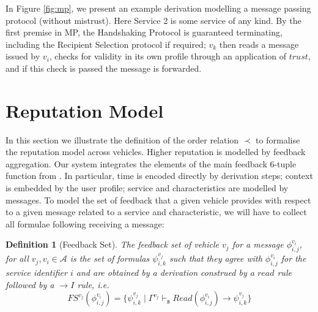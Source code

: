 \documentclass[compsoc, conference, letterpaper, 10pt, times]{IEEEtran}
\newtheorem{definition}{Definition}
\begin{document}

In Figure \ref{fig:mp}, we present an example derivation modelling a message passing protocol (without mistrust). Here Service 2 is some service of any kind. By the first premise in MP, the Handshaking Protocol is guaranteed terminating, including the Recipient Selection protocol if required; $v_{k}$ then reads a message issued by $v_{i}$, checks for validity in its own profile through an application of $trust$, and if this check is passed the message is forwarded.



\begin{figure*}
	\begin{prooftree}
		\end{prooftree}

	\caption{The Message Passing Protocol}\label{fig:mp}
\end{figure*}



\section{Reputation Model}\label{sec:reputation}

In this section we illustrate the definition of the order relation $\prec$ to formalise the reputation model across vehicles. Higher reputation is modelled by feedback aggregation. Our system integrates the elements of the main feedback 6-tuple function from \cite{glenford}. In particular, time is encoded directly by derivation steps; context is embedded by the user profile; service and characteristics are modelled by messages. To model the set of feedback that a given vehicle provides with respect to a given message related to a service and characteristic, we will have to collect all formulae following receiving a message:

\begin{definition}[Feedback Set]
The feedback set of vehicle $v_{j}$ for a message $\phi^{v_{i}}_{i,j}$, for all $v_{j}, v_{i} \in \mathcal{A}$ is the set of formulas $\psi^{v_{j}}_{i,k}$ such that they agree with $\phi^{v_{i}}_{i,j}$ for the service identifier $i$ and are obtained by a derivation construed by a $read$ rule followed by a $\rightarrow I$ rule, i.e.
%
\[
FS^{v_{j}}(\phi^{v_{i}}_{i,j})=\{ \psi^{v_{j}}_{i,k}\mid \Gamma^{v_{j}}
\vdash_{\mathtt{s}}  Read(\phi^{v_{i}}_{i,j})\rightarrow \psi^{v_{j}}_{i,k}  \}
\]
\end{definition}
\end{document}
